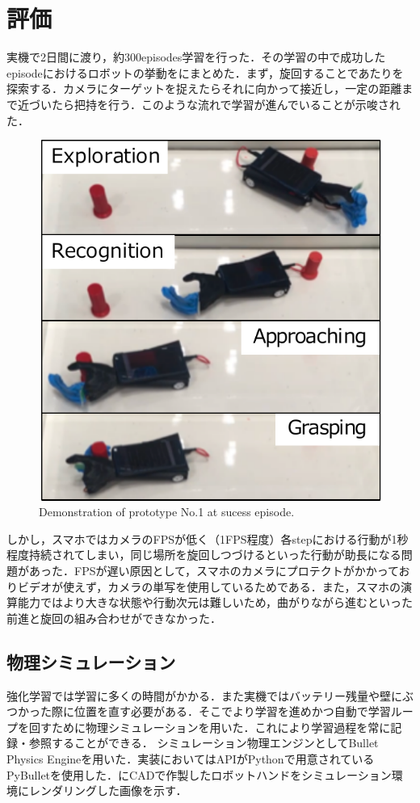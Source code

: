\section{評価}
実機で2日間に渡り，約300episodes学習を行った．その学習の中で成功したepisodeにおけるロボットの挙動をにまとめた．まず，旋回することであたりを探索する．カメラにターゲットを捉えたらそれに向かって接近し，一定の距離まで近づいたら把持を行う．このような流れで学習が進んでいることが示唆された．
\begin{figure}
    \centering
    \includegraphics[width=0.7\linewidth]{figure/chapter3/robothand-v1_demo}
    \caption{Demonstration of prototype No.1 at sucess episode.}
    \label{fig:1号機例}
\end{figure}

しかし，スマホではカメラのFPSが低く（1FPS程度）各stepにおける行動が1秒程度持続されてしまい，同じ場所を旋回しつづけるといった行動が助長になる問題があった．FPSが遅い原因として，スマホのカメラにプロテクトがかかっておりビデオが使えず，カメラの単写を使用しているためである．また，スマホの演算能力ではより大きな状態や行動次元は難しいため，曲がりながら進むといった前進と旋回の組み合わせができなかった．


\subsection{物理シミュレーション}
強化学習では学習に多くの時間がかかる．また実機ではバッテリー残量や壁にぶつかった際に位置を直す必要がある．そこでより学習を進めかつ自動で学習ループを回すために物理シミュレーションを用いた．これにより学習過程を常に記録・参照することができる．
シミュレーション物理エンジンとしてBullet Physics Engineを用いた．実装においてはAPIがPythonで用意されているPyBulletを使用した．にCADで作製したロボットハンドをシミュレーション環境にレンダリングした画像を示す．

